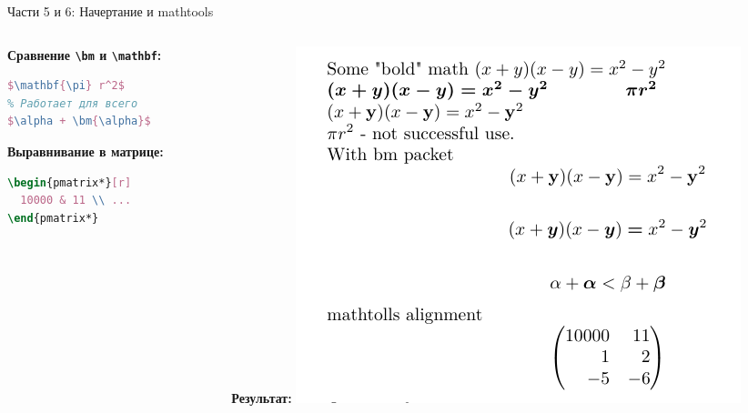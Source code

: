 \documentclass[aspectratio=169]{beamer}
\begin{document}
\begin{frame}[fragile]{Части 5 и 6: Начертание и mathtools}
    \begin{columns}[T]
        \begin{column}{0.45\textwidth}
            \textbf{Сравнение \texttt{\textbackslash bm} и \texttt{\textbackslash mathbf}:}
            \begin{lstlisting}[language=tex]
% Не работает для греческих
$\mathbf{\pi} r^2$
% Работает для всего
$\alpha + \bm{\alpha}$
            \end{lstlisting}
            \textbf{Выравнивание в матрице:}
            \begin{lstlisting}[language=tex]
\begin{pmatrix*}[r]
  10000 & 11 \\ ...
\end{pmatrix*}
            \end{lstlisting}
        \end{column}
        \begin{column}{0.55\textwidth}
            \textbf{Результат:}
            \includegraphics[width=\textwidth, height=0.7\textheight, keepaspectratio]{image/5.png}
        \end{column}
    \end{columns}
\end{frame}
\end{document}

